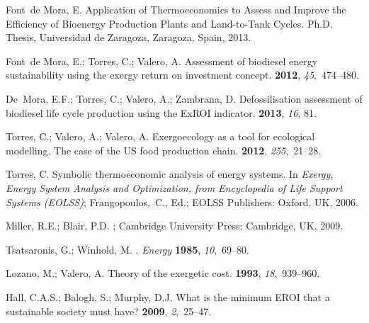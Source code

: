 \documentclass[sustainability,article,accept,moreauthors,pdftex,12pt,a4paper]{mdpi}
\begin{document}
\begin{thebibliography}{----}
Font~de Mora, E.
\newblock Application of Thermoeconomics to Assess and Improve the Efficiency
 of Bioenergy Production Plants and Land-to-Tank Cycles.
\newblock Ph.D. Thesis, Universidad de Zaragoza, Zaragoza, Spain, 2013.

Font~de Mora, E.; Torres, C.; Valero, A.
\newblock Assessment of biodiesel energy sustainability using the exergy return
 on investment concept.
 {\bf 2012}, {\em 45},~474--480.

De~Mora, E.F.; Torres, C.; Valero, A.; Zambrana, D.
\newblock Defossilisation assessment of biodiesel life cycle production using
 the ExROI indicator.
 {\bf 2013}, {\em 16}, 81.

Torres, C.; Valero, A.; Valero, A.
\newblock Exergoecology as a tool for ecological modelling. The case of the US
 food production chain.
 {\bf 2012}, {\em 255},~21--28.

Torres, C.
\newblock Symbolic thermoeconomic analysis of energy systems. In {\em Exergy,
 Energy System Analysis and Optimization, from Encyclopedia of Life Support
 Systems (EOLSS)}; \mbox{Frangopoulos, C.,} Ed.; EOLSS Publishers: Oxford, UK, 2006.

Miller, R.E.; Blair, P.D.
; Cambridge
 University Press: Cambridge, UK, 2009.

Tsatsaronis, G.; Winhold, M.
.
{\em Energy} {\bf 1985}, {\em 10},~{69--80}.

Lozano, M.; Valero, A.
\newblock Theory of the exergetic cost.
 {\bf 1993}, {\em 18},~939--960.

Hall, C.A.S.; Balogh, S.; Murphy, D.J.
\newblock What is the minimum EROI that a sustainable society must have?
 {\bf 2009}, {\em 2},~25--47.

\end{thebibliography}
\end{document}
